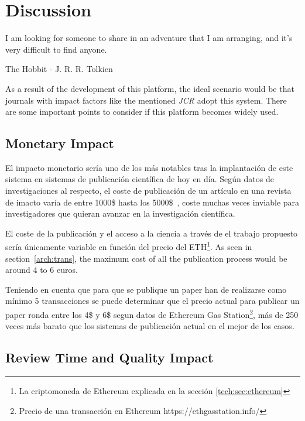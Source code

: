 \chapter{Discussion}

\begin{FraseCelebre}
  \begin{Frase}
    I am looking for someone to share in an adventure that I am arranging, and
    it's very difficult to find anyone.
  \end{Frase}
  \begin{Fuente}
    The Hobbit - J. R. R. Tolkien
  \end{Fuente}
\end{FraseCelebre}

As a result of the development of this platform, the ideal scenario would be
that journals with impact factors like the mentioned \emph{JCR} adopt this
system. There are some important points to consider if this platform becomes
widely used.



\section{Monetary Impact}
El impacto monetario sería uno de los más notables tras la implantación de este
sistema en sistemas de publicación científica de hoy en día. Según datos de
investigaciones al respecto, el coste de publicación de un artículo en una
revista de imacto varía de entre 1000\$ hasta los
5000\$~\cite{van2013true,russel2008business}, coste muchas veces inviable para
investigadores que quieran avanzar en la investigación científica.

El coste de la publicación y el acceso a la ciencia a través de el trabajo
propuesto sería únicamente variable en función del precio del ETH\footnote{La
  criptomoneda de Ethereum explicada en la sección \ref{tech:sec:ethereum}}. As
seen in section~\ref{arch:trans}, the maximum cost of all the publication
process would be around 4 to 6 euros.

Teniendo en cuenta que para que se publique un paper han de realizarse como
mínimo 5 transacciones se puede determinar que el precio actual para publicar un
paper ronda entre los 4\$ y 6\$ segun datos de Ethereum Gas
Station\footnote{Precio de una transacción en Ethereum
  https://ethgasstation.info/}, más de 250 veces más barato que los sistemas de
publicación actual en el mejor de los casos.

\section{Review Time and Quality Impact}

